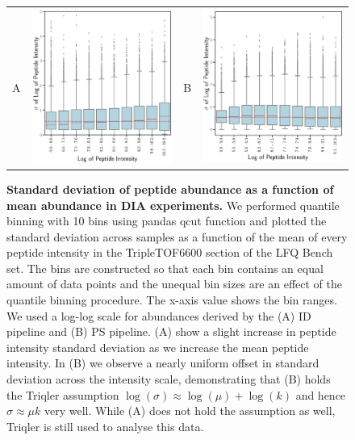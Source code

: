 \documentclass[11pt]{article}
\begin{document}
\begin{figure}[hbt]
    \centering
    \centering
    \begin{tabular}{lclc} 
        A & \includegraphics[width=0.4\linewidth]{../../result/report_plots_pipeline/quantile_bins_ID_median.png} &
        B & \includegraphics[width=0.4\linewidth]{../../result/report_plots_pipeline/quantile_bins_PS_median.png} \\
    \end{tabular}
  \caption{{\bf Standard deviation of peptide abundance as a function of mean abundance in DIA experiments.} We performed quantile binning with 10 bins using pandas qcut function and plotted the standard deviation across samples as a function of the mean of every peptide intensity in the TripleTOF6600 section of the LFQ Bench set. The bins are constructed so that each bin contains an equal amount of data points and the unequal bin sizes are an effect of the quantile binning procedure. The x-axis value shows the bin ranges. We used a log-log scale for abundances derived by the (A) ID pipeline and (B) PS pipeline. (A) show a slight increase in peptide intensity standard deviation as we increase the mean peptide intensity. In (B) we observe a nearly uniform offset in standard deviation across the intensity scale, demonstrating that (B) holds the Triqler assumption $\log(\sigma) \approx \log(\mu) + \log(k)$ and hence   $\sigma \approx \mu k$ very well. While (A) does not hold the assumption as well, Triqler is still used to analyse this data.  \label{fig:uniform_offset_in_standard_deviation_boxplot}}

 \end{figure}
\end{document}
